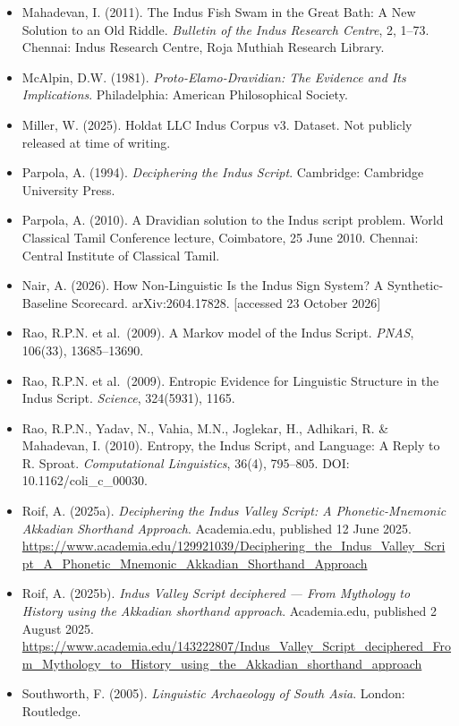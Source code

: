 \documentclass[
]{article}
\begin{document}
\begin{itemize}
{  Studies}, 7(1), 1--38.
\item
  Mahadevan, I. (2011). The Indus Fish Swam in the Great Bath: A New
  Solution to an Old Riddle. \emph{Bulletin of the Indus Research
  Centre}, 2, 1--73. Chennai: Indus Research Centre, Roja Muthiah
  Research Library.
\item
  McAlpin, D.W. (1981). \emph{Proto-Elamo-Dravidian: The Evidence and
  Its Implications}. Philadelphia: American Philosophical Society.
\item
  Miller, W. (2025). Holdat LLC Indus Corpus v3. Dataset. Not publicly released at time of writing.
\item
  Parpola, A. (1994). \emph{Deciphering the Indus Script}. Cambridge:
  Cambridge University Press.
\item
  Parpola, A. (2010). A Dravidian solution to the Indus script problem.
  World Classical Tamil Conference lecture, Coimbatore, 25 June 2010.
  Chennai: Central Institute of Classical Tamil.
\item
  Nair, A. (2026). How Non-Linguistic Is the Indus Sign System? A Synthetic-Baseline Scorecard. arXiv:2604.17828. [accessed 23 October 2026]
\item
  Rao, R.P.N. et al.~(2009). A Markov model of the Indus Script.
  \emph{PNAS}, 106(33), 13685--13690.
\item
  Rao, R.P.N. et al.~(2009). Entropic Evidence for Linguistic Structure
  in the Indus Script. \emph{Science}, 324(5931), 1165.
\item
  Rao, R.P.N., Yadav, N., Vahia, M.N., Joglekar, H., Adhikari, R. \& Mahadevan, I. (2010). Entropy, the Indus Script, and Language: A Reply to R. Sproat. \emph{Computational Linguistics}, 36(4), 795--805. DOI: 10.1162/coli\_c\_00030.
\item
  Roif, A. (2025a). \emph{Deciphering the Indus Valley Script: A
  Phonetic-Mnemonic Akkadian Shorthand Approach}. Academia.edu,
  published 12 June 2025.
  \url{https://www.academia.edu/129921039/Deciphering_the_Indus_Valley_Script_A_Phonetic_Mnemonic_Akkadian_Shorthand_Approach}
\item
  Roif, A. (2025b). \emph{Indus Valley Script deciphered --- From
  Mythology to History using the Akkadian shorthand approach}.
  Academia.edu, published 2 August 2025.
  \url{https://www.academia.edu/143222807/Indus_Valley_Script_deciphered_From_Mythology_to_History_using_the_Akkadian_shorthand_approach}
\item
  Southworth, F. (2005). \emph{Linguistic Archaeology of South Asia}.
  London: Routledge.

\end{itemize}
\end{document}
